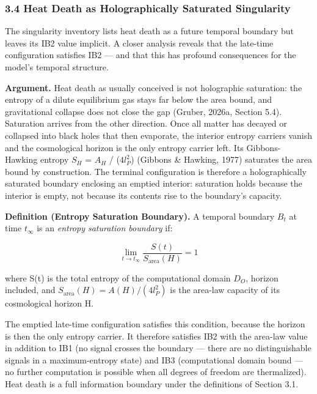 \documentclass[
]{article}
\begin{document}
\hypertarget{heat-death-as-holographically-saturated-singularity}{%
\subsubsection{3.4 Heat Death as Holographically Saturated
Singularity}\label{heat-death-as-holographically-saturated-singularity}}

The singularity inventory lists heat death as a future temporal boundary
but leaves its IB2 value implicit. A closer analysis reveals that the
late-time configuration satisfies IB2 --- and that this has profound
consequences for the model's temporal structure.

\textbf{Argument.} Heat death as usually conceived is not holographic
saturation: the entropy of a dilute equilibrium gas stays far below the
area bound, and gravitational collapse does not close the gap (Gruber,
2026a, Section 5.4). Saturation arrives from the other direction. Once
all matter has decayed or collapsed into black holes that then
evaporate, the interior entropy carriers vanish and the cosmological
horizon is the only entropy carrier left. Its Gibbons-Hawking entropy
\(S_{H}\) = \(A_{H}\) / (\(4 l_P^2\)) (Gibbons \& Hawking, 1977)
saturates the area bound by construction. The terminal configuration is
therefore a holographically saturated boundary enclosing an emptied
interior: saturation holds because the interior is empty, not because
its contents rise to the boundary's capacity.

\textbf{Definition (Entropy Saturation Boundary).} A temporal boundary
\(B_{t}\) at time \(t_{\infty}\) is an \emph{entropy saturation
boundary} if:

\[\lim_{t \to t_\infty} \frac{S(t)}{S_{\text{area}}(H)} = 1\]

where S(t) is the total entropy of the computational domain \(D_O\),
horizon included, and \(S_{\mathrm{area}}(H) = A(H) / (4 l_P^2)\) is the
area-law capacity of its cosmological horizon H.

The emptied late-time configuration satisfies this condition, because
the horizon is then the only entropy carrier. It therefore satisfies IB2
with the area-law value in addition to IB1 (no signal crosses the
boundary --- there are no distinguishable signals in a maximum-entropy
state) and IB3 (computational domain bound --- no further computation is
possible when all degrees of freedom are thermalized). Heat death is a
full information boundary under the definitions of Section 3.1.
\end{document}
